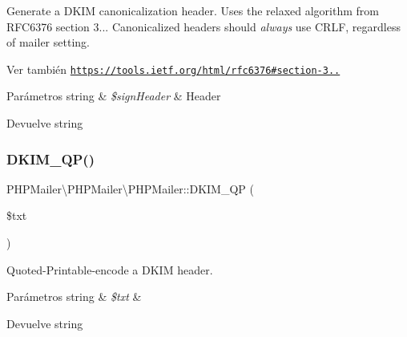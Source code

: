 Generate a D\+K\+IM canonicalization header. Uses the \textquotesingle{}relaxed\textquotesingle{} algorithm from R\+F\+C6376 section 3... Canonicalized headers should {\itshape always} use C\+R\+LF, regardless of mailer setting.

\begin{DoxySeeAlso}{Ver también}
\href{https://tools.ietf.org/html/rfc6376#section-3.4.2}{\tt https\+://tools.\+ietf.\+org/html/rfc6376\#section-\/3..}
\end{DoxySeeAlso}

\begin{DoxyParams}[1]{Parámetros}
string & {\em \$sign\+Header} & Header\\
\hline
\end{DoxyParams}
\begin{DoxyReturn}{Devuelve}
string 
\end{DoxyReturn}
\mbox{\label{classPHPMailer_1_1PHPMailer_1_1PHPMailer_a196685b4b2a4f98988533f7c55b2df43}} 
\subsubsection{\texorpdfstring{D\+K\+I\+M\+\_\+\+Q\+P()}{DKIM\_QP()}}
{\footnotesize\ttfamily P\+H\+P\+Mailer\textbackslash{}\+P\+H\+P\+Mailer\textbackslash{}\+P\+H\+P\+Mailer\+::\+D\+K\+I\+M\+\_\+\+QP (\begin{DoxyParamCaption}\item[{}]{\$txt }\end{DoxyParamCaption})}

Quoted-\/\+Printable-\/encode a D\+K\+IM header.


\begin{DoxyParams}[1]{Parámetros}
string & {\em \$txt} & \\
\hline
\end{DoxyParams}
\begin{DoxyReturn}{Devuelve}
string 
\end{DoxyReturn}
\mbox{\label{classPHPMailer_1_1PHPMailer_1_1PHPMailer_a2bead1890dd20b30e1089a65dd44a669}} 
